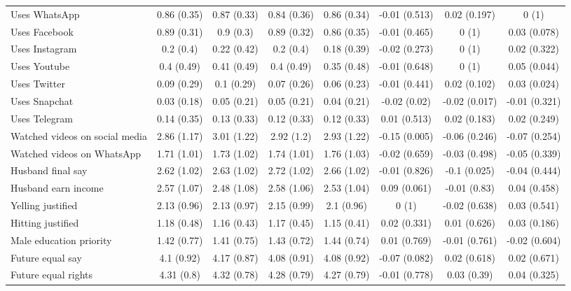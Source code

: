 \begin{table}[H]
\begin{tabular}{lccccccc}
  Uses WhatsApp & 0.86 (0.35) & 0.87 (0.33) & 0.84 (0.36) & 0.86 (0.34) & -0.01 (0.513) & 0.02 (0.197) & 0 (1) \\ 
  Uses Facebook & 0.89 (0.31) & 0.9 (0.3) & 0.89 (0.32) & 0.86 (0.35) & -0.01 (0.465) & 0 (1) & 0.03 (0.078) \\ 
  Uses Instagram & 0.2 (0.4) & 0.22 (0.42) & 0.2 (0.4) & 0.18 (0.39) & -0.02 (0.273) & 0 (1) & 0.02 (0.322) \\ 
  Uses Youtube & 0.4 (0.49) & 0.41 (0.49) & 0.4 (0.49) & 0.35 (0.48) & -0.01 (0.648) & 0 (1) & 0.05 (0.044) \\ 
  Uses Twitter & 0.09 (0.29) & 0.1 (0.29) & 0.07 (0.26) & 0.06 (0.23) & -0.01 (0.441) & 0.02 (0.102) & 0.03 (0.024) \\ 
  Uses Snapchat & 0.03 (0.18) & 0.05 (0.21) & 0.05 (0.21) & 0.04 (0.21) & -0.02 (0.02) & -0.02 (0.017) & -0.01 (0.321) \\ 
  Uses Telegram & 0.14 (0.35) & 0.13 (0.33) & 0.12 (0.33) & 0.12 (0.33) & 0.01 (0.513) & 0.02 (0.183) & 0.02 (0.249) \\ 
  Watched videos on social media & 2.86 (1.17) & 3.01 (1.22) & 2.92 (1.2) & 2.93 (1.22) & -0.15 (0.005) & -0.06 (0.246) & -0.07 (0.254) \\ 
  Watched videos on WhatsApp & 1.71 (1.01) & 1.73 (1.02) & 1.74 (1.01) & 1.76 (1.03) & -0.02 (0.659) & -0.03 (0.498) & -0.05 (0.339) \\ 
  Husband final say & 2.62 (1.02) & 2.63 (1.02) & 2.72 (1.02) & 2.66 (1.02) & -0.01 (0.826) & -0.1 (0.025) & -0.04 (0.444) \\ 
  Husband earn income & 2.57 (1.07) & 2.48 (1.08) & 2.58 (1.06) & 2.53 (1.04) & 0.09 (0.061) & -0.01 (0.83) & 0.04 (0.458) \\ 
  Yelling justified & 2.13 (0.96) & 2.13 (0.97) & 2.15 (0.99) & 2.1 (0.96) & 0 (1) & -0.02 (0.638) & 0.03 (0.541) \\ 
  Hitting justified & 1.18 (0.48) & 1.16 (0.43) & 1.17 (0.45) & 1.15 (0.41) & 0.02 (0.331) & 0.01 (0.626) & 0.03 (0.186) \\ 
  Male education priority & 1.42 (0.77) & 1.41 (0.75) & 1.43 (0.72) & 1.44 (0.74) & 0.01 (0.769) & -0.01 (0.761) & -0.02 (0.604) \\ 
  Future equal say & 4.1 (0.92) & 4.17 (0.87) & 4.08 (0.91) & 4.08 (0.92) & -0.07 (0.082) & 0.02 (0.618) & 0.02 (0.671) \\ 
  Future equal rights & 4.31 (0.8) & 4.32 (0.78) & 4.28 (0.79) & 4.27 (0.79) & -0.01 (0.778) & 0.03 (0.39) & 0.04 (0.325) \\ 

\end{tabular}
\end{table}
